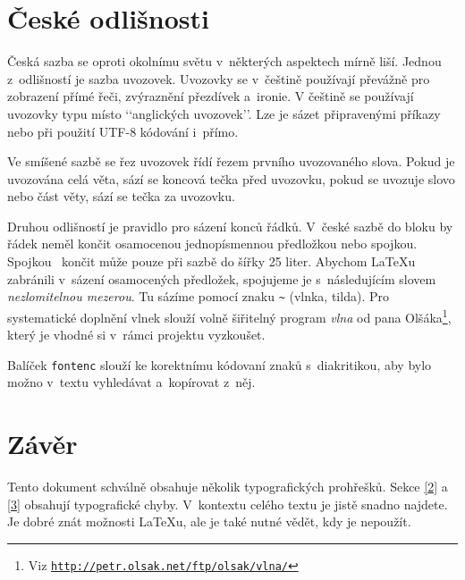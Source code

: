 \documentclass[10pt, twocolumn, a4paper]{article}
\begin{document}
\section{České odlišnosti}
Česká sazba se oproti okolnímu světu v~některých aspektech mírně liší.
Jednou z~odlišností je sazba uvozovek.
Uvozovky se v~češtině používají převážně pro zobrazení přímé řeči, zvýraznění přezdívek a~ironie.
V češtině se používají uvozovky typu  místo ‘‘anglických uvozovek’’.
Lze je sázet připravenými příkazy nebo při použití UTF-8 kódování i~přímo.
\par
Ve smíšené sazbě se řez uvozovek řídí řezem prvního uvozovaného slova.
Pokud je uvozována celá věta, sází se koncová tečka před uvozovku, pokud se uvozuje slovo nebo část věty, sází se tečka za uvozovku.
\par
Druhou odlišností je pravidlo pro sázení konců řádků.
V~české sazbě do bloku by řádek neměl končit osamocenou jednopísmennou předložkou nebo spojkou.
Spojkou ~končit může pouze při sazbě do šířky 25 liter.
Abychom \LaTeX{}u zabránili v~sázení osamocených předložek, spojujeme je s~následujícím slovem \emph{nezlomitelnou mezerou}.
Tu sázíme pomocí znaku \verb|~| (vlnka, tilda).
Pro systematické doplnění vlnek slouží volně šiřitelný program \emph{vlna} od pana 
Olšáka\footnote{Viz \href{http://petr.olsak.net/ftp/olsak/vlna/}{\texttt{http://petr.olsak.net/ftp/olsak/vlna/}}}, který je vhodné si v~rámci projektu vyzkoušet.
\par
Balíček \texttt{fontenc} slouží ke korektnímu kódovaní znaků s~diakritikou, aby bylo možno v~textu vyhledávat a~kopírovat z~něj.

\section{Závěr}
Tento dokument schválně obsahuje několik typografických prohřešků.
Sekce \ref{2} a \ref{3} obsahují typografické chyby.
V~kontextu celého textu je jistě snadno najdete.
Je dobré znát možnosti \LaTeX{}u, ale je také nutné vědět, kdy je nepoužít.
\end{document}

